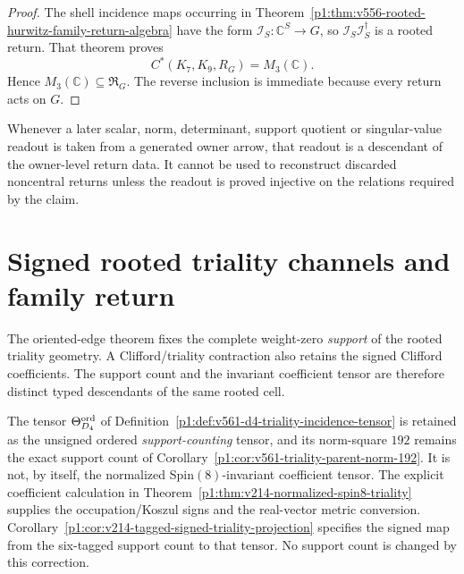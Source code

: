 \documentclass[11pt]{article}
\begin{document}
\begin{proof}
The shell incidence maps occurring in
Theorem~\ref{p1:thm:v556-rooted-hurwitz-family-return-algebra} have the form
$\mathcal I_S:\mathbb C^S\to G$, so
$\mathcal I_S\mathcal I_S^\dagger$ is a rooted return.  That theorem proves
\[
 C^*(K_7,K_9,R_G)=M_3(\mathbb C).
\]
Hence $M_3(\mathbb C)\subseteq\mathfrak R_G$.  The reverse inclusion is
immediate because every return acts on $G$.
\end{proof}

\begin{corollary}
\label{p1:cor:v566-return-before-scalar-readout}
Whenever a later scalar, norm, determinant, support quotient or singular-value
readout is taken from a generated owner arrow, that readout is a descendant of
the owner-level return data.  It cannot be used to reconstruct discarded
noncentral returns unless the readout is proved injective on the relations
required by the claim.
\end{corollary}

\section{Signed rooted triality channels and family return}
\label{p1:sec:v567-signed-triality-channel-family}
The oriented-edge theorem fixes the complete weight-zero \emph{support}
of the rooted triality geometry.  A Clifford/triality contraction also
retains the signed Clifford coefficients.  The
support count and the invariant coefficient tensor are therefore distinct
typed descendants of the same rooted cell.

\begin{remark}
\label{p1:rem:v567-v561-support-scope}
The tensor $\Theta_{D_4}^{\rm ord}$ of
Definition~\ref{p1:def:v561-d4-triality-incidence-tensor} is retained as the
unsigned ordered \emph{support-counting} tensor, and its norm-square $192$
remains the exact support count of Corollary~\ref{p1:cor:v561-triality-parent-norm-192}.
It is not, by itself, the normalized Spin$(8)$-invariant coefficient tensor.
The explicit coefficient calculation in
Theorem~\ref{p1:thm:v214-normalized-spin8-triality} supplies the
occupation/Koszul signs and the real-vector metric conversion.
Corollary~\ref{p1:cor:v214-tagged-signed-triality-projection} specifies
the signed map from the six-tagged support count to that tensor.
No support count is changed by this correction.
\end{remark}
\end{document}
